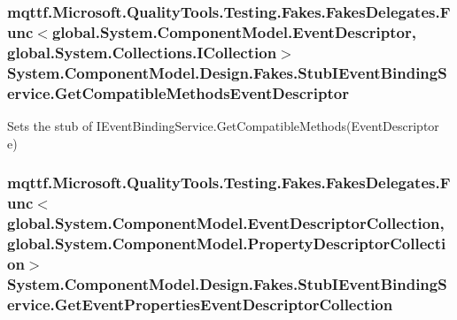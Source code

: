 \hypertarget{class_system_1_1_component_model_1_1_design_1_1_fakes_1_1_stub_i_event_binding_service_a0b7fb4a9cac4a0abed4e63407eb92cee}{
\subsubsection[{Get\-Compatible\-Methods\-Event\-Descriptor}]{\setlength{\rightskip}{0pt plus 5cm}mqttf.\-Microsoft.\-Quality\-Tools.\-Testing.\-Fakes.\-Fakes\-Delegates.\-Func$<$global.\-System.\-Component\-Model.\-Event\-Descriptor, global.\-System.\-Collections.\-I\-Collection$>$ System.\-Component\-Model.\-Design.\-Fakes.\-Stub\-I\-Event\-Binding\-Service.\-Get\-Compatible\-Methods\-Event\-Descriptor}}\label{class_system_1_1_component_model_1_1_design_1_1_fakes_1_1_stub_i_event_binding_service_a0b7fb4a9cac4a0abed4e63407eb92cee}


Sets the stub of I\-Event\-Binding\-Service.\-Get\-Compatible\-Methods(\-Event\-Descriptor e)

\hypertarget{class_system_1_1_component_model_1_1_design_1_1_fakes_1_1_stub_i_event_binding_service_a3b97bf594a2bfddec9c35cd68de5234c}{
\subsubsection[{Get\-Event\-Properties\-Event\-Descriptor\-Collection}]{\setlength{\rightskip}{0pt plus 5cm}mqttf.\-Microsoft.\-Quality\-Tools.\-Testing.\-Fakes.\-Fakes\-Delegates.\-Func$<$global.\-System.\-Component\-Model.\-Event\-Descriptor\-Collection, global.\-System.\-Component\-Model.\-Property\-Descriptor\-Collection$>$ System.\-Component\-Model.\-Design.\-Fakes.\-Stub\-I\-Event\-Binding\-Service.\-Get\-Event\-Properties\-Event\-Descriptor\-Collection}}\label{class_system_1_1_component_model_1_1_design_1_1_fakes_1_1_stub_i_event_binding_service_a3b97bf594a2bfddec9c35cd68de5234c}


